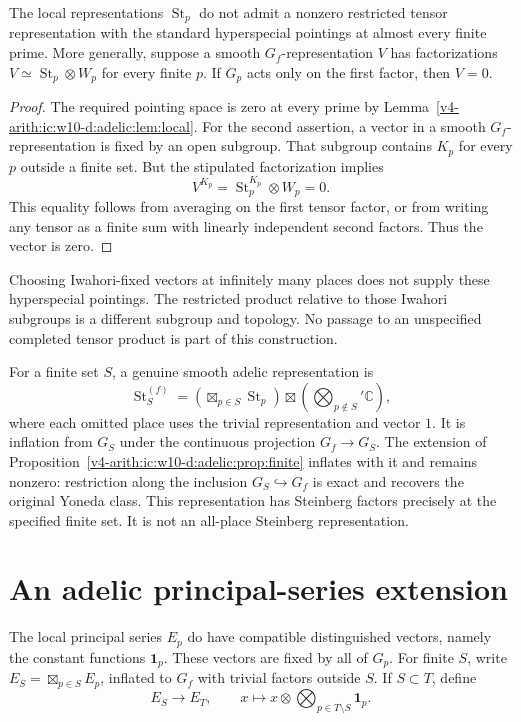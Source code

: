 \begin{proposition}\label{v4-arith:ic:w10-d:adelic:prop:noall}
The local representations $\operatorname{St}_p$ do not admit a nonzero restricted
tensor representation with the standard hyperspecial pointings at almost
every finite prime. More generally, suppose a smooth $G_f$-representation $V$ has
factorizations $V\simeq\operatorname{St}_p\otimes W_p$ for every finite $p$.
If $G_p$ acts only on the first factor, then $V=0$.
\end{proposition}
\begin{proof}
The required pointing space is zero at every prime by
Lemma~\ref{v4-arith:ic:w10-d:adelic:lem:local}. For the second assertion, a vector in a smooth
$G_f$-representation is fixed by an open subgroup. That subgroup contains
$K_p$ for every $p$ outside a finite set. But the stipulated factorization
implies
\[
 V^{K_p}=\operatorname{St}_p^{K_p}\otimes W_p=0.
\]
This equality follows from averaging on the first tensor factor, or from
writing any tensor as a finite sum with linearly independent second
factors. Thus the vector is zero.
\end{proof}

Choosing Iwahori-fixed vectors at infinitely many places does not supply
these hyperspecial pointings. The restricted product relative to those
Iwahori subgroups is a different subgroup and topology. No passage to
an unspecified completed tensor product is part of this construction.

For a finite set $S$, a genuine smooth adelic representation is
\[
 \operatorname{St}_S^{(f)}=\left(\boxtimes_{p\in S}\operatorname{St}_p\right)
               \boxtimes\left(\bigotimes_{p\notin S}'\mathbb C\right),
\]
where each omitted place uses the trivial representation and vector $1$.
It is inflation from $G_S$ under the continuous projection $G_f\to G_S$.
The extension of Proposition~\ref{v4-arith:ic:w10-d:adelic:prop:finite} inflates with it and remains
nonzero: restriction along the inclusion $G_S\hookrightarrow G_f$ is
exact and recovers the original Yoneda class. This representation has
Steinberg factors precisely at the specified finite set. It is not an
all-place Steinberg representation.

\section{An adelic principal-series extension}

The local principal series $E_p$ do have compatible distinguished vectors,
namely the constant functions $\mathbf1_p$. These vectors are fixed by
all of $G_p$. For finite $S$, write $E_S=\boxtimes_{p\in S}E_p$, inflated
to $G_f$ with trivial factors outside $S$. If $S\subset T$, define
\[
 E_S\longrightarrow E_T,\qquad
 x\longmapsto x\otimes\bigotimes_{p\in T\setminus S}\mathbf1_p.
\]

